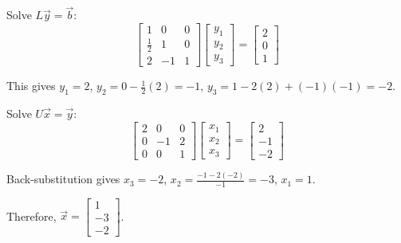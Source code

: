\documentclass[reqno]{exam}
\begin{document}
\begin{questions}
\begin{solution}
    Solve $L\vec{y} = \vec{b}$:
    $$\begin{bmatrix} 1 & 0 & 0 \\ \frac{1}{2} & 1 & 0 \\ 2 & -1 & 1 \end{bmatrix} \begin{bmatrix} y_1 \\ y_2 \\ y_3 \end{bmatrix} = \begin{bmatrix} 2 \\ 0 \\ 1 \end{bmatrix}$$
    
    This gives $y_1 = 2$, $y_2 = 0 - \frac{1}{2}(2) = -1$, $y_3 = 1 - 2(2) + (-1)(-1) = -2$.

    Solve $U\vec{x} = \vec{y}$:
    $$\begin{bmatrix} 2 & 0 & 0 \\ 0 & -1 & 2 \\ 0 & 0 & 1 \end{bmatrix} \begin{bmatrix} x_1 \\ x_2 \\ x_3 \end{bmatrix} = \begin{bmatrix} 2 \\ -1 \\ -2 \end{bmatrix}$$
    
    Back-substitution gives $x_3 = -2$, $x_2 = \frac{-1 - 2(-2)}{-1} = -3$, $x_1 = 1$.
    
    Therefore, $\vec{x} = \begin{bmatrix} 1 \\ -3 \\ -2 \end{bmatrix}$.
  \end{solution}
  \newpage


\end{questions}
\end{document}
